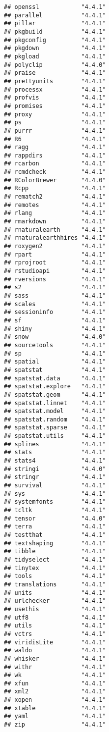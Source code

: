 \documentclass[
]{article}
\begin{document}
\begin{verbatim}
## openssl            "4.4.1"
## parallel           "4.4.1"
## pillar             "4.4.1"
## pkgbuild           "4.4.1"
## pkgconfig          "4.4.1"
## pkgdown            "4.4.1"
## pkgload            "4.4.1"
## polyclip           "4.4.0"
## praise             "4.4.1"
## prettyunits        "4.4.1"
## processx           "4.4.1"
## profvis            "4.4.1"
## promises           "4.4.1"
## proxy              "4.4.1"
## ps                 "4.4.1"
## purrr              "4.4.1"
## R6                 "4.4.1"
## ragg               "4.4.1"
## rappdirs           "4.4.1"
## rcarbon            "4.4.1"
## rcmdcheck          "4.4.1"
## RColorBrewer       "4.4.0"
## Rcpp               "4.4.1"
## rematch2           "4.4.1"
## remotes            "4.4.1"
## rlang              "4.4.1"
## rmarkdown          "4.4.1"
## rnaturalearth      "4.4.1"
## rnaturalearthhires "4.4.1"
## roxygen2           "4.4.1"
## rpart              "4.4.1"
## rprojroot          "4.4.1"
## rstudioapi         "4.4.1"
## rversions          "4.4.1"
## s2                 "4.4.1"
## sass               "4.4.1"
## scales             "4.4.1"
## sessioninfo        "4.4.1"
## sf                 "4.4.1"
## shiny              "4.4.1"
## snow               "4.4.0"
## sourcetools        "4.4.1"
## sp                 "4.4.1"
## spatial            "4.4.1"
## spatstat           "4.4.1"
## spatstat.data      "4.4.1"
## spatstat.explore   "4.4.1"
## spatstat.geom      "4.4.1"
## spatstat.linnet    "4.4.1"
## spatstat.model     "4.4.1"
## spatstat.random    "4.4.1"
## spatstat.sparse    "4.4.1"
## spatstat.utils     "4.4.1"
## splines            "4.4.1"
## stats              "4.4.1"
## stats4             "4.4.1"
## stringi            "4.4.0"
## stringr            "4.4.1"
## survival           "4.4.1"
## sys                "4.4.1"
## systemfonts        "4.4.1"
## tcltk              "4.4.1"
## tensor             "4.4.0"
## terra              "4.4.1"
## testthat           "4.4.1"
## textshaping        "4.4.1"
## tibble             "4.4.1"
## tidyselect         "4.4.1"
## tinytex            "4.4.1"
## tools              "4.4.1"
## translations       "4.4.1"
## units              "4.4.1"
## urlchecker         "4.4.1"
## usethis            "4.4.1"
## utf8               "4.4.1"
## utils              "4.4.1"
## vctrs              "4.4.1"
## viridisLite        "4.4.1"
## waldo              "4.4.1"
## whisker            "4.4.1"
## withr              "4.4.1"
## wk                 "4.4.1"
## xfun               "4.4.1"
## xml2               "4.4.1"
## xopen              "4.4.1"
## xtable             "4.4.1"
## yaml               "4.4.1"
## zip                "4.4.1"
\end{verbatim}
\end{document}
